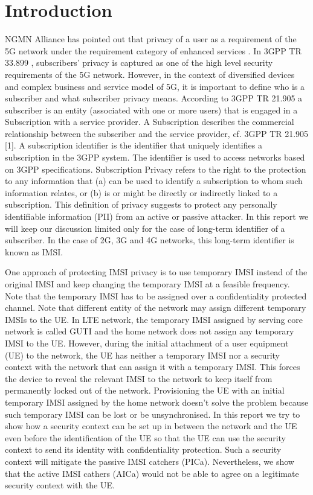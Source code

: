 \documentclass[lnicst,sechang,a4paper]{svmultln}
\begin{document}
\section{Introduction}
\label{intro} NGMN Alliance has pointed out that privacy of a user as a requirement of the 5G network under the requirement category of enhanced services \cite{NGMN_white_paper}. In 3GPP TR 33.899 \cite{TR33899}, subscribers' privacy is captured as one of the high level security requirements of the 5G network. However, in the context of diversified devices and complex business and service model of 5G, it is important to define who is a subscriber and what subscriber privacy means. According to 3GPP TR 21.905 \cite{TR21905} a subscriber is an entity (associated with one or more users) that is engaged in a Subscription with a service provider. A Subscription describes the commercial relationship between the subscriber and the service provider, cf. 3GPP TR 21.905 [1]. A subscription identifier is the identifier that uniquely identifies a subscription in the 3GPP system. The identifier is used to access networks based on 3GPP specifications. Subscription Privacy refers to the right to the protection to any information that (a) can be used to identify a subscription to whom such information relates, or (b) is or might be directly or indirectly linked to a subscription. This definition of privacy suggests to protect any personally identifiable information (PII) from an active or passive attacker. In this report we will keep our discussion limited only for the case of long-term identifier of a subscriber. In the case of 2G, 3G and 4G networks, this long-term identifier is known as IMSI. 


One approach of protecting IMSI privacy is to use temporary IMSI instead of the original IMSI and keep changing the temporary IMSI at a feasible frequency. Note that the temporary IMSI has to be assigned over a confidentiality protected channel. Note that different entity of the network may assign different temporary IMSIs to the UE. In LTE network, the temporary IMSI assigned by serving core network is called GUTI and the home network does not assign any temporary IMSI to the UE.  However, during the initial attachment of a user equipment (UE) to the network, the UE has neither a temporary IMSI nor a security context with the network that can assign it with a temporary IMSI. This forces the device to reveal the relevant IMSI to the network to keep itself from permanently locked out of the network. Provisioning the UE with an initial temporary IMSI assigned by the home network doesn't solve the problem because such temporary IMSI can be lost or be unsynchronised. In this report we try to show how a security context can be set up in between the network and the UE even before the identification of the UE so that the UE can use the security context to send its identity with confidentiality protection. Such a security context will mitigate the passive IMSI catchers (PICa). Nevertheless, we show that the active IMSI cathers (AICa) would not be able to agree on a legitimate security context with the UE.
\end{document}
